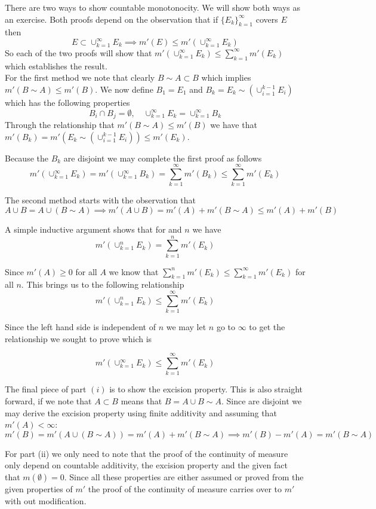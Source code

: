 \documentclass[11pt,reqno]{article}
\begin{document}
There are two ways to show countable monotonocity. We will show both ways as an exercise. Both proofs depend on the observation that if $\{ E_k \}_{k = 1}^\infty$ covers $E$ then
\[ E \subset \cup_{k = 1}^\infty E_k \implies m'(E) \le m'(\cup_{k = 1}^\infty E_k) \]
So each of the two proofs will show that $m'(\cup_{k = 1}^\infty E_k) \le \sum_{k = 1}^\infty m'(E_k)$ which establishes the result. \\

For the first method we note that clearly $B \sim A \subset B$ which implies $m'(B \sim A) \le m'(B)$. We now define $B_1 = E_1$ and $B_k  = E_k \sim (\cup_{i = 1}^{k - 1} E_i)$ which has the following properties
\[ B_i \cap B_j = \emptyset, \quad \cup_{k = 1}^\infty E_k = \cup_{k = 1}^\infty B_k  \]
Through the relationship that $m'(B \sim A) \le m'(B)$ we have that $m'(B_k) = m'(E_k \sim (\cup_{i = 1}^{k - 1} E_i)) \le m'(E_k)$.

Because the $B_k$ are disjoint we may complete the first proof as follows
\[ m'(\cup_{k = 1}^\infty E_k ) = m'(\cup_{k = 1}^\infty B_k ) = \sum_{k = 1}^\infty m'(B_k) \le  \sum_{k = 1}^\infty m'(E_k) \]

\noindent The second method starts with the observation that 
\[ A \cup B = A \cup (B \sim A) \implies m'(A \cup B) = m'(A) + m'(B \sim A) \le m'(A) + m'(B) \]

\noindent A simple inductive argument shows that for and $n$ we have
\[ m'(\cup_{k = 1}^n E_k) = \sum_{k = 1}^n m'(E_k) \]

\noindent Since $m'(A) \ge 0$ for all $A$ we know that $\sum_{k = 1}^n m'(E_k) \le \sum_{k = 1}^\infty m'(E_k)$ for all $n$. This brings us to the following relationship
\[ m'(\cup_{k = 1}^n E_k) \le \sum_{k = 1}^\infty m'(E_k) \]

Since the left hand side is independent of $n$ we may let $n$ go to $\infty$ to get the relationship we sought to prove which is

\[ m'(\cup_{k = 1}^\infty E_k) \le \sum_{k = 1}^\infty m'(E_k) \]

The final piece of part $(i)$ is to show the excision property. This is also straight forward, if we note that $A \subset B$ means that $B = A \cup B \sim A$. Since are disjoint we may derive the excision property using finite additivity and assuming that $m'(A) < \infty$:
\[ m'(B) = m'(A \cup (B \sim A)) = m'(A) + m'(B \sim A) \implies m'(B) - m'(A) = m'(B \sim A) \]

For part (ii) we only need to note that the proof of the continuity of measure only depend on countable additivity, the excision property and the given fact that $m(\emptyset)  = 0$. Since all these properties are either assumed or proved from the given properties of $m'$ the proof of the continuity of measure carries over to $m'$ with out modification.
\end{document}
